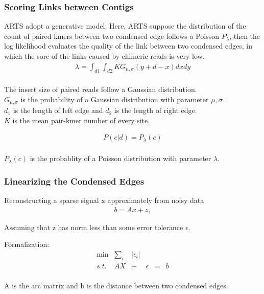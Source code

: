 \documentclass[mathserif]{beamer}
\begin{document}
		\begin{frame}
		\frametitle{Scoring Links between Contigs}
		ARTS adopt a generative model; Here, ARTS suppose the distribution of the count of paired kmers between two condensed edge follows a Poisson $P_{\lambda}$, then the log likelihood evaluates the quality of the link between two condensed edges, in which the sore of the links caused by chimeric reads is very low. 
		\begin{eqnarray}
   							\lambda = \int _{d1} \int _{d2} KG_{\mu , \sigma}(y+d-x)dxdy
    		\end{eqnarray}\\
    		The insert size of paired reads follow a Gaussian distribution.\\
    		$G_{\mu , \sigma}$ is the probability of a Gaussian distribution with parameter $\mu , \sigma$ .\\
    		$d_{1}$ is the length of left edge and $d_{2}$ is the length of right edge.\\
    		$K$ is the mean pair-kmer number of every site. 
    		
		\begin{eqnarray}
   							P(c|d) = P_{\lambda}(c)
    		\end{eqnarray}\\
    		
    		$P_{\lambda}(c)$ is the probablity of a Poisson distribution with parameter $\lambda$. 
    		
		\end{frame}
		
		\begin{frame}
		\frametitle{Linearizing the Condensed Edges}
			Reconstructing a sparse signal x approximately from noisy data
			\begin{eqnarray}
			b = Ax + z, 
			\end{eqnarray}
			
			Assuming that z has norm less than some error tolerance $\epsilon$.
			
			Formalization:
		\[
		\begin{array}{rrrrrrrrlr}
		 \min & \sum _{i}  & |{\epsilon}_{i}| &  &\\
		 s.t. &  AX & + & \epsilon & = & b\\
		\end{array} \nonumber
		\]
		
		A is the arc matrix and b is the distance between two condensed edges.
		\end{frame}	
	
\end{document}
